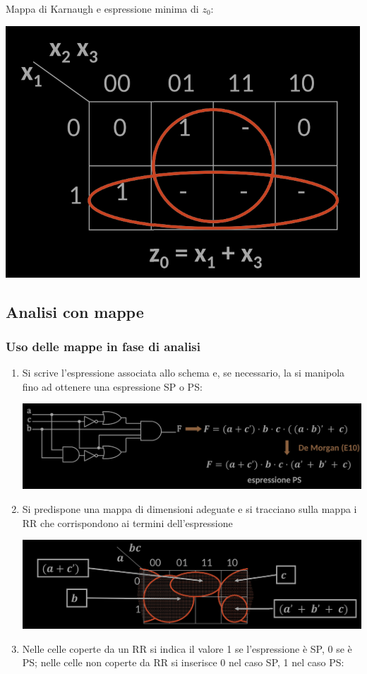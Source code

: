 \documentclass{article}
\begin{document}
Mappa di Karnaugh e espressione minima di $z_0$:
\begin{center}
    \includegraphics[scale=0.55]{Z2.png}
\end{center}
\subsection{Analisi con mappe}
\subsubsection{Uso delle mappe in fase di analisi}
\begin{enumerate}
    \item Si scrive l'espressione associata allo schema e, se necessario, la si manipola fino ad ottenere una espressione SP o PS:
    \begin{center}
        \includegraphics[scale=0.45]{mappeanalisi1.png}
    \end{center}
    \item Si predispone una mappa di dimensioni adeguate e si tracciano sulla mappa i RR che corrispondono ai termini dell'espressione
    \begin{center}
        \includegraphics[scale=0.45]{mappeanalisi2.png}
    \end{center}
    \item Nelle celle coperte da un RR si indica il valore 1 se l'espressione è SP, 0 se è PS; nelle celle non coperte da RR si inserisce 0 nel caso SP, 1 nel caso PS:
\end{enumerate}
\end{document}
